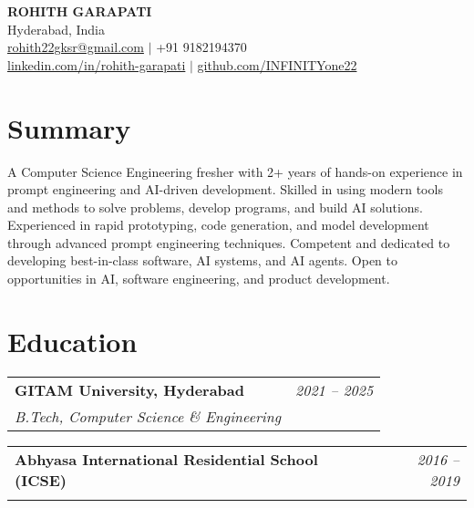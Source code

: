 \documentclass[11pt,a4paper]{article}
\makeatletter
\newcommand{\resumeSubHeading}[4]{
  \vspace{-2pt}\begin{tabular*}{\textwidth}{l@{\extracolsep{\fill}}r}
    \textbf{#1} & \textit{#2} \\
    \textit{\small#3} & \textit{\small#4} \\
  \end{tabular*}\vspace{-2pt}
}
\makeatother
\begin{document}
\begin{center}
    {\Huge \bfseries ROHITH GARAPATI} \\
    \vspace{3pt}
    Hyderabad, India \\
    \href{mailto:rohith22gksr@gmail.com}{rohith22gksr@gmail.com} $|$ +91 9182194370 \\
    \href{https://linkedin.com/in/rohith-garapati-649912160}{linkedin.com/in/rohith-garapati} $|$
    \href{https://github.com/INFINITYone22}{github.com/INFINITYone22}
\end{center}

\section{Summary}
A Computer Science Engineering fresher with 2+ years of hands-on experience in prompt engineering and AI-driven development. Skilled in using modern tools and methods to solve problems, develop programs, and build AI solutions. Experienced in rapid prototyping, code generation, and model development through advanced prompt engineering techniques. Competent and dedicated to developing best-in-class software, AI systems, and AI agents. Open to opportunities in AI, software engineering, and product development.

\section{Education}
\resumeSubHeading{GITAM University, Hyderabad}{2021 -- 2025}{B.Tech, Computer Science \& Engineering}{}
\resumeSubHeading{Abhyasa International Residential School (ICSE)}{2016 -- 2019}{}{}


\end{document}
